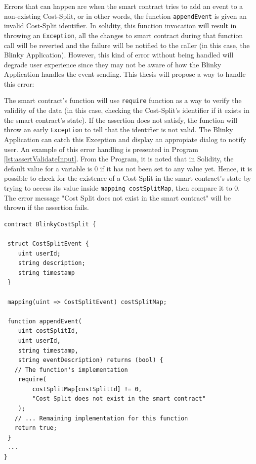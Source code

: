Errors that can happen are when the smart contract tries to add an event to a non-existing Cost-Split, or in other words, the function \texttt{appendEvent} is given an invalid Cost-Split identifier. In solidity, this function invocation will result in throwing an \texttt{Exception}, all the changes to smart contract during that function call will be reverted and the failure will be notified to the caller (in this case, the Blinky Application). However, this kind of error without being handled will degrade user experience since they may not be aware of how the Blinky Application handles the event sending. This thesis will propose a way to handle this error:

 The smart contract's function will use \texttt{require} function as a way to verify the validity of the data (in this case, checking the Cost-Split's identifier if it exists in the smart contract's state). If the assertion does not satisfy, the function will throw an early \texttt{Exception} to tell that the identifier is not valid. The Blinky Application can catch this Exception and display an appropiate dialog to notify user. An example of this error handling is presented in Program \ref{lst:assertValidateInput}. From the Program, it is noted that in Solidity, the default value for a variable is 0 if it has not been set to any value yet. Hence, it is possible to check for the existence of a Cost-Split in the smart contract's state by trying to access its value inside \texttt{mapping costSplitMap}, then compare it to 0. The error message "Cost Split does not exist in the smart contract" will be thrown if the assertion fails.

\begin{lstlisting}[float,caption={Using \texttt{require} function to validate input data},label={lst:assertValidateInput},language=Solidity]
contract BlinkyCostSplit {
 
 struct CostSplitEvent {
    uint userId;
    string description;
    string timestamp
 }
 
 mapping(uint => CostSplitEvent) costSplitMap;
 
 function appendEvent(
    uint costSplitId,
    uint userId,
    string timestamp,
    string eventDescription) returns (bool) {
   // The function's implementation
    require(
        costSplitMap[costSplitId] != 0,
        "Cost Split does not exist in the smart contract"
    );
   // ... Remaining implementation for this function
   return true;
 }
 ...
}
\end{lstlisting}